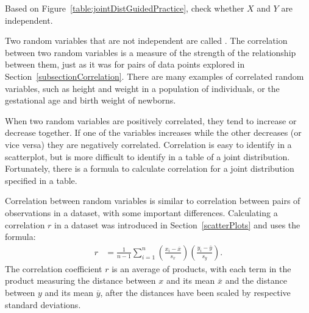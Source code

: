 \begin{exercisewrap}
\begin{nexercise}
Based on Figure~\ref{table:jointDistGuidedPractice}, check whether $X$ and $Y$ are independent.\footnotemark{}
\end{nexercise}
\end{exercisewrap}

Two random variables that are not independent are called .  The correlation between two random variables is a measure of the strength of the relationship between them, just as it was for pairs of data points explored in Section~\ref{subsectionCorrelation}.  There are many examples of correlated random variables, such as height and weight in a population of individuals, or the gestational age and birth weight of newborns.  

When two random variables are positively correlated, they tend to increase or decrease together. If one of the variables increases while the other decreases (or vice versa) they are negatively correlated.  Correlation is easy to identify in a scatterplot, but is more difficult to identify in a table of a joint distribution.  Fortunately, there is a formula to calculate correlation for a joint distribution specified  in a table.

 Correlation between random variables is similar to correlation between pairs of observations in a dataset, with some important differences.  Calculating a correlation $r$ in a dataset was introduced in Section~\ref{scatterPlots} and uses the formula:
\begin{align}
r &=  \frac{1}{n-1}\sum^{n}_{i=1}
\left(\frac{x_{i}-\overline{x}}
{s_{x}}\right)\left(\frac{y_{i}-\overline{y}}{s_{y}}\right).
\end{align} 
The correlation coefficient $r$ is an average of products, with each term in the product measuring the distance between $x$ and its mean $\overline{x}$ and the distance between $y$ and its mean $\overline{y}$, after the distances have been scaled by respective standard deviations.

